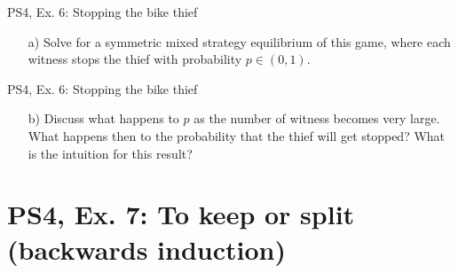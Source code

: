 \begin{frame}{PS4, Ex. 6: Stopping the bike thief}
    \begin{itemize}
      \item[a)] Solve for a symmetric mixed strategy equilibrium of this game, where each witness stops the thief with probability $p\in(0,1)$.
    \end{itemize}
\end{frame}
\begin{frame}{PS4, Ex. 6: Stopping the bike thief}
    \begin{itemize}
      \item[b)] Discuss what happens to $p$ as the number of witness becomes very large. What happens then to the probability that the thief will get stopped? What is the intuition for this result?
    \end{itemize}
\end{frame}

\section{PS4, Ex. 7: To keep or split (backwards induction)}

